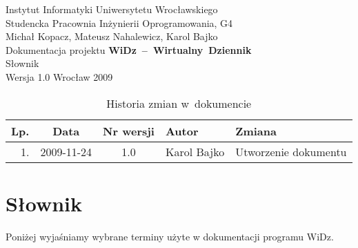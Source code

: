 \documentclass[12pt,leqno,twoside]{mwart}
\begin{document}
\begin{titlepage}
\begin{center}
Instytut Informatyki Uniwersytetu Wrocławskiego \\
Studencka Pracownia Inżynierii Oprogramowania, G4 \\
\vspace{4cm}
\Large Michał Kopacz, Mateusz Nahalewicz, Karol Bajko \\
\vspace{0.5cm}
\huge Dokumentacja projektu \mbox{\textbf{WiDz -- Wirtualny Dziennik}} \\ \Large Słownik\\
\vspace{1cm}
\normalsize Wersja 1.0
\vfill
\normalsize Wrocław 2009
\end{center}
\end{titlepage}

\newpage

\begin{table}
	\centering
	\caption{Historia zmian w~dokumencie}
		\begin{tabular}{|r|c|c|l|l|}
		\hline
		Lp. 	& Data       & Nr wersji 	& Autor           		& Zmiana \\ \hline
		1.   	& 2009-11-24 & 1.0       	& Karol Bajko & Utworzenie dokumentu \\ \hline
		\end{tabular}
\end{table}

\newpage

\tableofcontents

\newpage

\section{Słownik}
\noindent Poniżej wyjaśniamy wybrane terminy użyte w dokumentacji programu WiDz.
\end{document}
